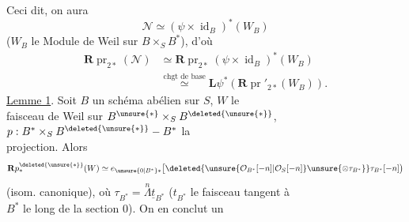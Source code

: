 Ceci dit, on aura\\
\[
\mathcal N\simeq(\psi\times\operatorname{id}_B)^*(W_B)
\]
($W_B$ le Module de Weil sur $B\times_S B^*$), d'où
\[
\begin{aligned}
\mathbf R\operatorname{pr}_{2*}(\mathcal N)&\simeq\mathbf R\operatorname{pr}_{2*}(\psi\times\operatorname{id}_B)^*(W_B)\\
&\overset{\text{chgt de base}}{\simeq}\mathbf L\psi^*(\mathbf R\operatorname{pr}'_{2*}(W_B)).
\end{aligned}
\]
\uline{Lemme 1}. Soit $B$ un schéma abélien sur $S$,  $W$ le\\
faisceau de Weil sur $B^{\unsure{*}}\times_S B^{\deleted{\unsure{*}}}$, $p:B^*\times_S B^{\deleted{\unsure{*}}}\mathbin{-}B^*$ la\\
projection. Alors
\[
\mathbf Rp^{\deleted{\unsure{*}}}_*(W)\simeq
 e_{\unsure{0|B^*}*}\bigl[\deleted{\unsure{\mathcal O_{B^*}[-n]|\mathcal O_S[-n]}\unsure{\otimes\tau_{B^*}}}\tau_{B^*}[-n]\bigr)
\]
(isom. canonique), où $\tau_{B^*}=\overset{n}{\Lambda}\underline t_{B^*}$ ($t_{B^*}$ le faisceau tangent à\\
$B^*$ le long de la section $0$).
On en conclut un

